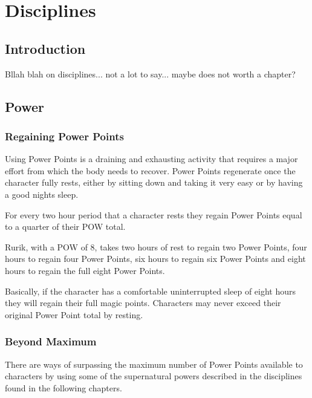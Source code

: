\chapter{Disciplines}
\label{ch:disciplines}

\section{Introduction}
Bllah blah on disciplines... not a lot to say... maybe does not worth a chapter?

\section{Power}

\subsection{Regaining Power Points}
Using Power Points is a draining and exhausting activity that requires a major effort from which the body needs to recover. Power Points regenerate once the character fully rests, either by sitting down and taking it very easy or by having a good nights sleep. 

For every two hour period that a character rests they regain Power Points equal to a quarter of their POW total.  

\begin{rpg-examplebox}
Rurik, with a POW of 8, takes two hours of rest to regain two Power Points, four hours to regain four Power Points, six hours to regain six Power Points and eight hours to regain the full eight Power Points. 
\end{rpg-examplebox}

Basically, if the character has a comfortable uninterrupted sleep of eight hours they will regain their full magic points. Characters may never exceed their original Power Point total by resting.

\subsection{Beyond Maximum}
There are ways of surpassing the maximum number of Power Points available to characters by using some of the supernatural powers described in the disciplines found in the following chapters.
